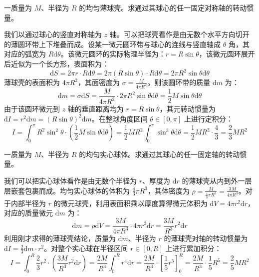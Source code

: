 \documentclass[lang=cn,11pt]{elegantbook}
\begin{document}
\begin{exercise}
一质量为 $M$、半径为 $R$ 的均匀薄球壳。求通过其球心的任一固定对称轴的转动惯量。
\end{exercise}
\begin{solution}
我们以通过球心的竖直对称轴为 $z$ 轴。可以把球壳看作是由无数个水平方向切开的薄圆环带上下堆叠而成。设某一微元圆环带与球心的连线与竖直轴成 $\theta$ 角，其对应的弧宽为 $R\mathrm{d}\theta$。该微元圆环的实际物理半径为：$r = R\sin\theta$，该微元圆环展开后近似为一个长方形，表面积为：\[\mathrm{d}S = 2\pi r \cdot R\mathrm{d}\theta = 2\pi (R\sin\theta) \cdot R\mathrm{d}\theta = 2\pi R^2\sin\theta\mathrm{d}\theta\]
薄球壳的表面积为 $4\pi R^2$，其面密度为 $\sigma = \frac{M}{4\pi R^2}$。则该圆环带的质量 $\mathrm{d}m$ 为：
$$\mathrm{d}m = \sigma \mathrm{d}S = \frac{M}{4\pi R^2} \cdot 2\pi R^2\sin\theta\mathrm{d}\theta = \frac{1}{2}M\sin\theta\mathrm{d}\theta$$
由于该圆环微元到 $z$ 轴的垂直距离均为 $r = R\sin\theta$，其元转动惯量为 $\mathrm{d}I = r^2\mathrm{d}m = (R\sin\theta)^2\mathrm{d}m$。在整球角度区间 $\theta \in [0, \pi]$ 上进行定积分：$$I = \int_{0}^{\pi} R^2\sin^2\theta \cdot \left(\frac{1}{2}M\sin\theta\mathrm{d}\theta\right) = \frac{1}{2}MR^2 \int_{0}^{\pi} \sin^3\theta \mathrm{d}\theta= \frac{1}{2}MR^2 \cdot \frac{4}{3} = \frac{2}{3}MR^2$$
\end{solution}

\begin{exercise}
一质量为 $M$、半径为 $R$ 的均匀实心球体。求通过其球心的任一固定轴的转动惯量。
\end{exercise}
\begin{solution}
我们可以把实心球体看作是由无数个半径为 $r$、厚度为 $\mathrm{d}r$ 的薄球壳从内到外一层层嵌套包裹而成。均匀实心球体的体积为 $\frac{4}{3}\pi R^3$，其体密度为 $\rho = \frac{M}{\frac{4}{3}\pi R^3} = \frac{3M}{4\pi R^3}$。对于内部半径为 $r$ 的微元球壳，利用表面积乘以厚度算得微元体积为 $\mathrm{d}V = 4\pi r^2 \mathrm{d}r$，对应的质量微元 $\mathrm{d}m$ 为：$$\mathrm{d}m = \rho \mathrm{d}V = \frac{3M}{4\pi R^3} \cdot 4\pi r^2 \mathrm{d}r = \frac{3M}{R^3}r^2\mathrm{d}r$$利用刚才求得的薄球壳结论，质量为 $\mathrm{d}m$、半径为 $r$ 的薄球壳对轴的转动惯量为 $\mathrm{d}I = \frac{2}{3}\mathrm{d}m \cdot r^2$。对整个实心球在半径区间 $r \in [0, R]$ 上进行累加积分：$$I = \int_{0}^{R} \frac{2}{3}r^2 \cdot \left(\frac{3M}{R^3}r^2\mathrm{d}r\right) = \frac{2M}{R^3} \int_{0}^{R} r^4 \mathrm{d}r = \frac{2M}{R^3} \cdot \left[ \frac{1}{5}r^5 \right]_0^R = \frac{2M}{R^3} \cdot \frac{1}{5}R^5 = \frac{2}{5}MR^2$$
\end{solution}
\end{document}
